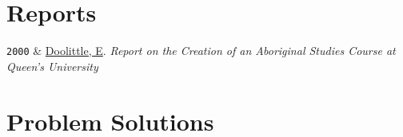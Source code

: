 \documentclass[9pt,a4paper]{article}
\newcommand{\LastName}{Doolittle}
\newcommand{\Initials}{E}
\newcommand{\Me}{\underline{\LastName, \Initials}}  %
\newcommand{\Year}[1]{\fontsize{10pt}{0}\selectfont \texttt{#1}}
\begin{document}
\section{Reports}

\begin{EntriesTableYear}
  \Year{2000} & \Me{}. \textit{Report on the Creation of an Aboriginal
    Studies Course at Queen's University}
\end{EntriesTableYear}

\section{Problem Solutions}
\end{document}
